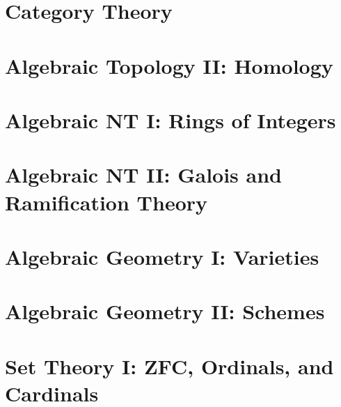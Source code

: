 \documentclass[11pt,numbers=noenddot]{scrreprt}
\begin{document}
\part{Category Theory}


\part{Algebraic Topology II: Homology}



\part{Algebraic NT I: Rings of Integers}





\part{Algebraic NT II: Galois and Ramification Theory}





\part{Algebraic Geometry I: Varieties}

\part{Algebraic Geometry II: Schemes}

\part{Set Theory I: ZFC, Ordinals, and Cardinals}



\end{document}
